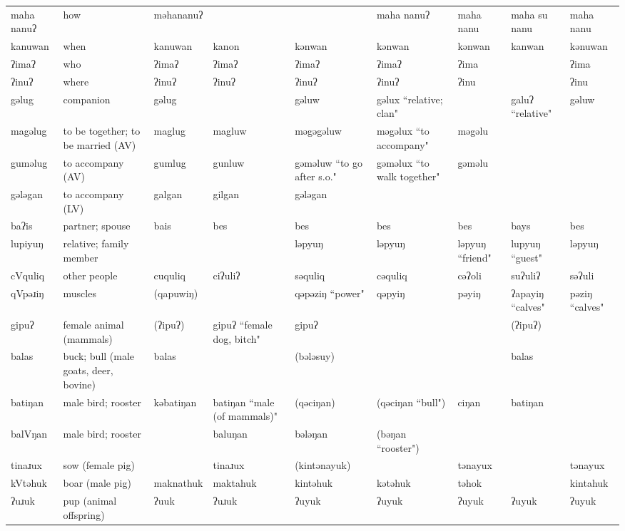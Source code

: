 \begin{landscape}
\begin{longtable}{*{9}{>{\raggedright\arraybackslash}p{}}}
\text{*}maha nanuʔ & how & məhananuʔ &  &  & maha nanuʔ & maha nanu & maha su nanu & maha nanu\\
\text{*}kanuwan & when & kanuwan & kanon & kənwan & kənwan & kənwan & kanwan & kənuwan\\
\text{*}ʔimaʔ & who & ʔimaʔ & ʔimaʔ & ʔimaʔ & ʔimaʔ & ʔima &  & ʔima\\
\text{*}ʔinuʔ & where & ʔinuʔ & ʔinuʔ & ʔinuʔ & ʔinuʔ & ʔinu &  & ʔinu\\
\text{*}gəlug & companion & gəlug &  & gəluw & gəlux ``relative; clan" &  & galuʔ ``relative" & gəluw\\
\text{*}magəlug & to be together; to be married (AV) & maglug & magluw & məgəgəluw & məgəlux ``to accompany" & məgəlu &  & \\
\text{*}guməlug & to accompany (AV) & gumlug & gunluw & gəməluw ``to go after s.o." & gəməlux ``to walk together" & gəməlu &  & \\
\text{*}gələgan & to accompany (LV) & galgan & gilgan & gələgan &  &  &  & \\
\text{*}baʔis & partner; spouse & bais & bes & bes & bes & bes & bays & bes\\
\text{*}lupiyuŋ & relative; family member &  &  & ləpyuŋ & ləpyuŋ & ləpyuŋ ``friend" & lupyuŋ ``guest" & ləpyuŋ\\
\text{*}cVquliq & other people & cuquliq & ciʔuliʔ & səquliq & cəquliq & cəʔoli & suʔuliʔ & səʔuli\\
\text{*}qVpəɹiŋ & muscles & (qapuwiŋ) &  & qəpəziŋ ``power" & qəpyiŋ & pəyiŋ & ʔapayiŋ ``calves" & pəziŋ ``calves"\\
\text{*}gipuʔ & female animal (mammals) & (ʔipuʔ) & gipuʔ ``female dog, bitch" & gipuʔ &  &  & (ʔipuʔ) & \\
\text{*}balas & buck; bull (male goats, deer, bovine) & balas &  & (bələsuy) &  &  & balas & \\
\text{*}batiŋan & male bird; rooster & kəbatiŋan & batiŋan ``male (of mammals)" & (qəciŋan) & (qəciŋan ``bull") & ciŋan & batiŋan & \\
\text{*}balVŋan & male bird; rooster &  & baluŋan & bələŋan & (bəŋan ``rooster") &  &  & \\
\text{*}tinaɹux & sow (female pig) &  & tinaɹux & (kintənayuk) &  & tənayux &  & tənayux\\
\text{*}kVtəhuk & boar (male pig) & maknathuk & maktahuk & kintəhuk & kətəhuk & təhok &  & kintahuk\\
\text{*}ʔuɹuk & pup (animal offspring) & ʔuuk & ʔuɹuk & ʔuyuk & ʔuyuk & ʔuyuk & ʔuyuk & ʔuyuk\\

\end{longtable}
\end{landscape}
